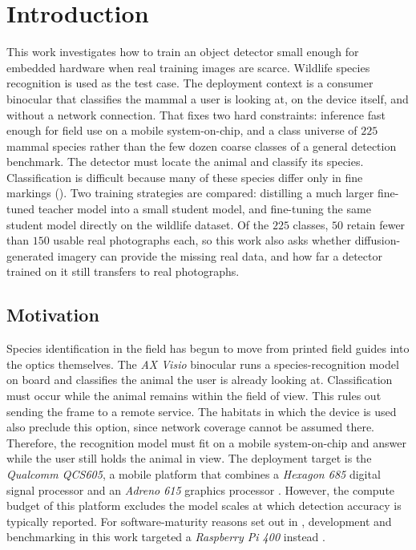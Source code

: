 \newpage
\cleardoublepage
\chapter{Introduction}\label{chapter:introduction}

This work investigates how to train an object detector small enough for embedded hardware when real training images are scarce. Wildlife species recognition is used as the test case. The deployment context is a consumer binocular that classifies the mammal a user is looking at, on the device itself, and without a network connection. That fixes two hard constraints: inference fast enough for field use on a mobile system-on-chip, and a class universe of $225$ mammal species rather than the few dozen coarse classes of a general detection benchmark. The detector must locate the animal and classify its species. Classification is difficult because many of these species differ only in fine markings (). Two training strategies are compared: distilling a much larger fine-tuned teacher model into a small student model, and fine-tuning the same student model directly on the wildlife dataset. Of the $225$ classes, $50$ retain fewer than $150$ usable real photographs each, so this work also asks whether diffusion-generated imagery can provide the missing real data, and how far a detector trained on it still transfers to real photographs.

\section{Motivation}\label{sec:motivation}

Species identification in the field has begun to move from printed field guides into the optics themselves. The \textit{AX Visio} binocular \cite{AXVisio} runs a species-recognition model on board and classifies the animal the user is already looking at. Classification must occur while the animal remains within the field of view. This rules out sending the frame to a remote service. The habitats in which the device is used also preclude this option, since network coverage cannot be assumed there. Therefore, the recognition model must fit on a mobile system-on-chip and answer while the user still holds the animal in view. The deployment target is the \textit{Qualcomm QCS605}, a mobile platform that combines a \textit{Hexagon 685} digital signal processor and an \textit{Adreno 615} graphics processor \cite{QCS605}. However, the compute budget of this platform excludes the model scales at which detection accuracy is typically reported. For software-maturity reasons set out in , development and benchmarking in this work targeted a \textit{Raspberry Pi 400} instead \cite{ltdBuyRaspberryPi}.

